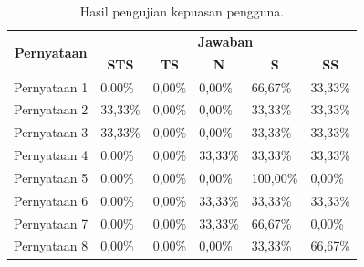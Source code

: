 \begin{table}[]
\caption{Hasil pengujian kepuasan pengguna.}
\label{tb:4_8}
\begin{tabular}{|c|l|l|l|l|l|}
\hline
\multirow{2}{*}{\textbf{Pernyataan}} & \multicolumn{5}{c|}{\textbf{Jawaban}}                                                                                                                                       \\ \cline{2-6} 
                                     & \multicolumn{1}{c|}{\textbf{STS}} & \multicolumn{1}{c|}{\textbf{TS}} & \multicolumn{1}{c|}{\textbf{N}} & \multicolumn{1}{c|}{\textbf{S}} & \multicolumn{1}{c|}{\textbf{SS}} \\ \hline
Pernyataan 1                         & 0,00\%                            & 0,00\%                           & 0,00\%                          & 66,67\%                         & 33,33\%                          \\ \hline
Pernyataan 2                         & 33,33\%                           & 0,00\%                           & 0,00\%                          & 33,33\%                         & 33,33\%                          \\ \hline
Pernyataan 3                         & 33,33\%                           & 0,00\%                           & 0,00\%                          & 33,33\%                         & 33,33\%                          \\ \hline
Pernyataan 4                         & 0,00\%                            & 0,00\%                           & 33,33\%                         & 33,33\%                         & 33,33\%                          \\ \hline
Pernyataan 5                         & 0,00\%                            & 0,00\%                           & 0,00\%                          & 100,00\%                        & 0,00\%                           \\ \hline
Pernyataan 6                         & 0,00\%                            & 0,00\%                           & 33,33\%                         & 33,33\%                         & 33,33\%                          \\ \hline
Pernyataan 7                         & 0,00\%                            & 0,00\%                           & 33,33\%                         & 66,67\%                         & 0,00\%                           \\ \hline
Pernyataan 8                         & 0,00\%                            & 0,00\%                           & 0,00\%                          & 33,33\%                         & 66,67\%                          \\ \hline

\end{tabular}
\end{table}
